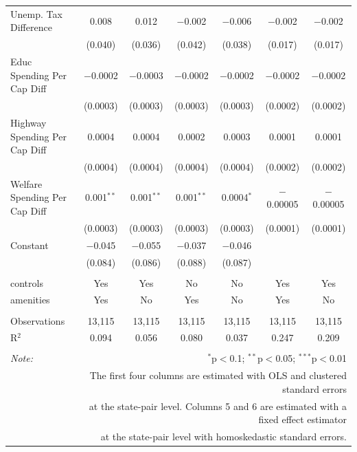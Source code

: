 \documentclass[12pt,a4paper]{article}
\begin{document}
\begin{landscape}
\begin{table}[!htbp]
\begin{tabular}{@{\extracolsep{5pt}}lcccccc}
  Unemp. Tax Difference & 0.008 & 0.012 & $-$0.002 & $-$0.006 & $-$0.002 & $-$0.002 \\ 
  & (0.040) & (0.036) & (0.042) & (0.038) & (0.017) & (0.017) \\ 
  Educ Spending Per Cap Diff & $-$0.0002 & $-$0.0003 & $-$0.0002 & $-$0.0002 & $-$0.0002 & $-$0.0002 \\ 
  & (0.0003) & (0.0003) & (0.0003) & (0.0003) & (0.0002) & (0.0002) \\ 
  Highway Spending Per Cap Diff & 0.0004 & 0.0004 & 0.0002 & 0.0003 & 0.0001 & 0.0001 \\ 
  & (0.0004) & (0.0004) & (0.0004) & (0.0004) & (0.0002) & (0.0002) \\ 
  Welfare Spending Per Cap Diff & 0.001$^{**}$ & 0.001$^{**}$ & 0.001$^{**}$ & 0.0004$^{*}$ & $-$0.00005 & $-$0.00005 \\ 
  & (0.0003) & (0.0003) & (0.0003) & (0.0003) & (0.0001) & (0.0001) \\ 
  Constant & $-$0.045 & $-$0.055 & $-$0.037 & $-$0.046 &  &  \\ 
  & (0.084) & (0.086) & (0.088) & (0.087) &  &  \\ 
 \hline \\[-1.8ex] 
controls & Yes & Yes & No & No & Yes & Yes \\ 
amenities & Yes & No & Yes & No & Yes & No \\ 
\hline \\[-1.8ex] 
Observations & 13,115 & 13,115 & 13,115 & 13,115 & 13,115 & 13,115 \\ 
R$^{2}$ & 0.094 & 0.056 & 0.080 & 0.037 & 0.247 & 0.209 \\ 
\hline 
\hline \\[-1.8ex] 
\textit{Note:}  & \multicolumn{6}{r}{$^{*}$p$<$0.1; $^{**}$p$<$0.05; $^{***}$p$<$0.01} \\ 
 & \multicolumn{6}{r}{The first four columns are estimated with OLS and clustered standard errors} \\ 
 & \multicolumn{6}{r}{at the state-pair level. Columns 5 and 6 are estimated with a fixed effect estimator} \\ 
 & \multicolumn{6}{r}{at the state-pair level with homoskedastic standard errors.} \\ 
\end{tabular} 
\end{table}
\end{landscape}
\restoregeometry
\end{document}
